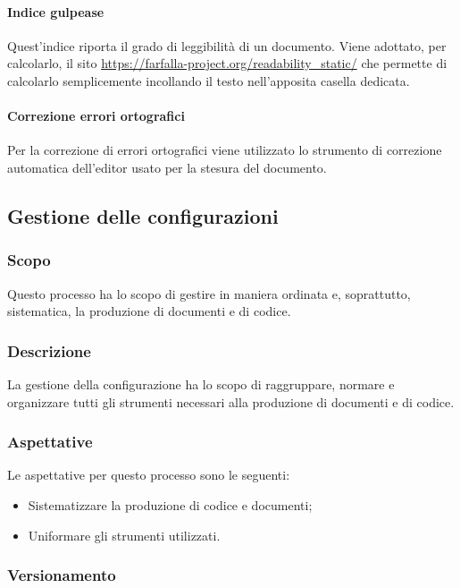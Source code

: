 \documentclass[../norme_di_progetto.tex]{subfiles}
\begin{document}
\paragraph{Indice gulpease}
Quest'indice riporta il grado di leggibilità di un documento. Viene adottato, per calcolarlo, il sito \url{https://farfalla-project.org/readability_static/} che permette di calcolarlo semplicemente incollando il testo nell'apposita casella dedicata.

\paragraph{Correzione errori ortografici}
Per la correzione di errori ortografici viene utilizzato lo strumento di correzione automatica dell'editor usato per la stesura del documento.


\subsection{Gestione delle configurazioni}

\subsubsection{Scopo}
Questo processo ha lo scopo di gestire in maniera ordinata e, soprattutto, sistematica, la produzione di documenti e di codice.

\subsubsection{Descrizione}
La gestione della configurazione ha lo scopo di raggruppare, normare e organizzare tutti gli strumenti necessari alla produzione di documenti e di codice.

\subsubsection{Aspettative}
Le aspettative per questo processo sono le seguenti:
\begin{itemize}
    \item Sistematizzare la produzione di codice e documenti;
    \item Uniformare gli strumenti utilizzati.
\end{itemize}

\subsubsection{Versionamento}
\end{document}
